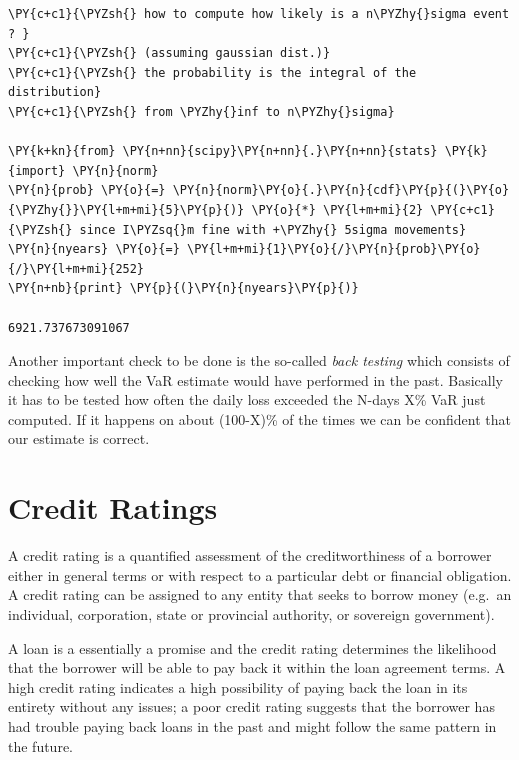     \begin{tcolorbox}[breakable, size=fbox, boxrule=1pt, pad at break*=1mm,colback=cellbackground, colframe=cellborder]
\begin{Verbatim}[commandchars=\\\{\}]
\PY{c+c1}{\PYZsh{} how to compute how likely is a n\PYZhy{}sigma event ? }
\PY{c+c1}{\PYZsh{} (assuming gaussian dist.)}
\PY{c+c1}{\PYZsh{} the probability is the integral of the distribution}
\PY{c+c1}{\PYZsh{} from \PYZhy{}inf to n\PYZhy{}sigma}

\PY{k+kn}{from} \PY{n+nn}{scipy}\PY{n+nn}{.}\PY{n+nn}{stats} \PY{k}{import} \PY{n}{norm}
\PY{n}{prob} \PY{o}{=} \PY{n}{norm}\PY{o}{.}\PY{n}{cdf}\PY{p}{(}\PY{o}{\PYZhy{}}\PY{l+m+mi}{5}\PY{p}{)} \PY{o}{*} \PY{l+m+mi}{2} \PY{c+c1}{\PYZsh{} since I\PYZsq{}m fine with +\PYZhy{} 5sigma movements}
\PY{n}{nyears} \PY{o}{=} \PY{l+m+mi}{1}\PY{o}{/}\PY{n}{prob}\PY{o}{/}\PY{l+m+mi}{252}
\PY{n+nb}{print} \PY{p}{(}\PY{n}{nyears}\PY{p}{)}

6921.737673091067
    \end{Verbatim}
\end{tcolorbox}

    Another important check to be done is the so-called \emph{back testing}
which consists of checking how well the VaR estimate would have
performed in the past. Basically it has to be tested how often the daily
loss exceeded the N-days X\% VaR just computed. If it happens on about
(100-X)\% of the times we can be confident that our estimate is correct.

\section{Credit Ratings}\label{credit-ratings}

A credit rating is a quantified assessment of the creditworthiness of a
borrower either in general terms or with respect to a particular debt or
financial obligation. A credit rating can be assigned to any entity that
seeks to borrow money (e.g.~an individual, corporation, state or
provincial authority, or sovereign government).

A loan is a essentially a promise and the credit rating determines the
likelihood that the borrower will be able to pay back it within the loan
agreement terms. A high credit rating indicates a high possibility of
paying back the loan in its entirety without any issues; a poor credit
rating suggests that the borrower has had trouble paying back loans in
the past and might follow the same pattern in the future.

